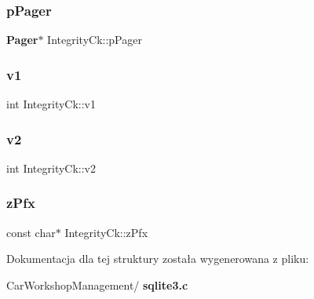 \mbox{\label{struct_integrity_ck_a87e7f8b012b61b61fae359269cbacce4}} 
\subsubsection{pPager}
{\footnotesize\ttfamily \textbf{ Pager}$\ast$ Integrity\+Ck\+::p\+Pager}

\mbox{\label{struct_integrity_ck_a94edb493175bd0c1862efbaeaff63be3}} 
\subsubsection{v1}
{\footnotesize\ttfamily int Integrity\+Ck\+::v1}

\mbox{\label{struct_integrity_ck_a0dd13b39fb4fd4e42de8ebf05af5c287}} 
\subsubsection{v2}
{\footnotesize\ttfamily int Integrity\+Ck\+::v2}

\mbox{\label{struct_integrity_ck_a126e42d437777815b1c1d74bcacb3b38}} 
\subsubsection{zPfx}
{\footnotesize\ttfamily const char$\ast$ Integrity\+Ck\+::z\+Pfx}



Dokumentacja dla tej struktury została wygenerowana z pliku\+:\begin{DoxyCompactItemize}
\item 
Car\+Workshop\+Management/\textbf{ sqlite3.\+c}\end{DoxyCompactItemize}
